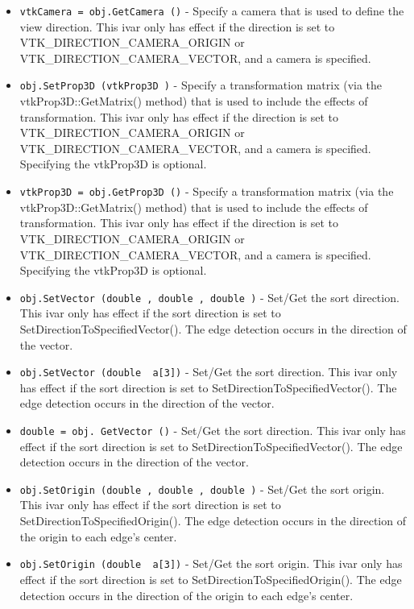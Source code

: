 \begin{itemize}
\item  \verb|vtkCamera = obj.GetCamera ()| -  Specify a camera that is used to define the view direction.  This ivar
 only has effect if the direction is set to VTK\_DIRECTION\_CAMERA\_ORIGIN or
 VTK\_DIRECTION\_CAMERA\_VECTOR, and a camera is specified.

\item  \verb|obj.SetProp3D (vtkProp3D )| -  Specify a transformation matrix (via the vtkProp3D::GetMatrix() method)
 that is used to include the effects of transformation. This ivar only has
 effect if the direction is set to VTK\_DIRECTION\_CAMERA\_ORIGIN or
 VTK\_DIRECTION\_CAMERA\_VECTOR, and a camera is specified. Specifying the
 vtkProp3D is optional.

\item  \verb|vtkProp3D = obj.GetProp3D ()| -  Specify a transformation matrix (via the vtkProp3D::GetMatrix() method)
 that is used to include the effects of transformation. This ivar only has
 effect if the direction is set to VTK\_DIRECTION\_CAMERA\_ORIGIN or
 VTK\_DIRECTION\_CAMERA\_VECTOR, and a camera is specified. Specifying the
 vtkProp3D is optional.

\item  \verb|obj.SetVector (double , double , double )| -  Set/Get the sort direction. This ivar only has effect if the sort
 direction is set to SetDirectionToSpecifiedVector(). The edge detection
 occurs in the direction of the vector.

\item  \verb|obj.SetVector (double  a[3])| -  Set/Get the sort direction. This ivar only has effect if the sort
 direction is set to SetDirectionToSpecifiedVector(). The edge detection
 occurs in the direction of the vector.

\item  \verb|double = obj. GetVector ()| -  Set/Get the sort direction. This ivar only has effect if the sort
 direction is set to SetDirectionToSpecifiedVector(). The edge detection
 occurs in the direction of the vector.

\item  \verb|obj.SetOrigin (double , double , double )| -  Set/Get the sort origin. This ivar only has effect if the sort direction
 is set to SetDirectionToSpecifiedOrigin(). The edge detection occurs in
 the direction of the origin to each edge's center.

\item  \verb|obj.SetOrigin (double  a[3])| -  Set/Get the sort origin. This ivar only has effect if the sort direction
 is set to SetDirectionToSpecifiedOrigin(). The edge detection occurs in
 the direction of the origin to each edge's center.


\end{itemize}
